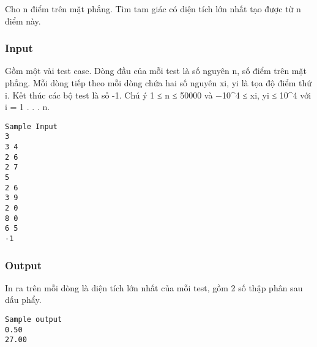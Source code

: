 









   Cho n điểm trên mặt phẳng. Tìm tam giác có diện tích lớn nhất tạo được từ n điểm này.  



\subsubsection{   Input  }



   Gồm một vài test case. Dòng đầu của mỗi test là số nguyên n, số điểm trên mặt phẳng.  Mỗi dòng tiếp theo mỗi dòng chứa hai số nguyên xi, yi là tọa độ điểm thứ i.  Kết thúc các bộ test là số -1.  Chú ý 1 ≤ n ≤ 50000 và −10^4 ≤ xi, yi ≤ 10^4 với i = 1 . . . n.  
\begin{verbatim}
Sample Input
3
3 4
2 6
2 7
5
2 6
3 9
2 0
8 0
6 5
-1
\end{verbatim}

\subsubsection{   Output  }



   In ra trên mỗi dòng là diện tích lớn nhất của mỗi test, gồm 2 số thập phân  sau dấu phẩy.  
\begin{verbatim}
Sample output
0.50
27.00
\end{verbatim}

